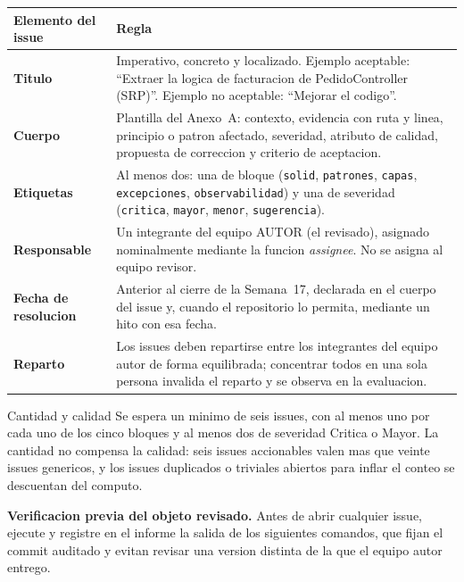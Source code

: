 \documentclass[11pt,a4paper]{article}
\begin{document}
\noindent
\begin{tabularx}{\linewidth}{@{}>{\bfseries}p{4.2cm} X@{}}
    \toprule
    \rowcolor{uteqSoft}\textbf{\color{uteqBlue}Elemento del issue} & \textbf{\color{uteqBlue}Regla} \\
    \midrule
    Titulo & Imperativo, concreto y localizado. Ejemplo aceptable: ``Extraer la logica de facturacion de PedidoController (SRP)''. Ejemplo no aceptable: ``Mejorar el codigo''. \\
    Cuerpo & Plantilla del Anexo~A: contexto, evidencia con ruta y linea, principio o patron afectado, severidad, atributo de calidad, propuesta de correccion y criterio de aceptacion. \\
    Etiquetas & Al menos dos: una de bloque (\texttt{solid}, \texttt{patrones}, \texttt{capas}, \texttt{excepciones}, \texttt{observabilidad}) y una de severidad (\texttt{critica}, \texttt{mayor}, \texttt{menor}, \texttt{sugerencia}). \\
    Responsable & Un integrante del equipo AUTOR (el revisado), asignado nominalmente mediante la funcion \emph{assignee}. No se asigna al equipo revisor. \\
    Fecha de resolucion & Anterior al cierre de la Semana~17, declarada en el cuerpo del issue y, cuando el repositorio lo permita, mediante un hito con esa fecha. \\
    Reparto & Los issues deben repartirse entre los integrantes del equipo autor de forma equilibrada; concentrar todos en una sola persona invalida el reparto y se observa en la evaluacion. \\
    \bottomrule
\end{tabularx}

\vspace{6pt}

\begin{avisoBox}{Cantidad y calidad}
    Se espera un minimo de seis issues, con al menos uno por cada uno de los cinco bloques y al menos dos de severidad Critica o Mayor. La cantidad no compensa la calidad: seis issues accionables valen mas que veinte issues genericos, y los issues duplicados o triviales abiertos para inflar el conteo se descuentan del computo.
\end{avisoBox}

\vspace{4pt}

\noindent\textbf{Verificacion previa del objeto revisado.} Antes de abrir cualquier issue, ejecute y registre en el informe la salida de los siguientes comandos, que fijan el commit auditado y evitan revisar una version distinta de la que el equipo autor entrego.
\end{document}
